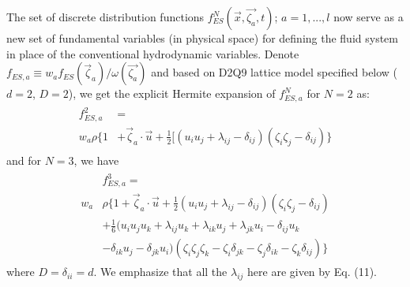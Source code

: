 \documentclass[aip,jmp,amsmath,amssymb,reprint,noshowpacs]{revtex4-1}
\begin{document}
The set of discrete distribution functions $f^N_{ES}(\vec{x},\vec{\zeta_a} ,t)$; $a =1,...,l$ now serve as a new set of fundamental variables (in physical space) for defining the fluid system in place of the conventional hydrodynamic variables.  Denote $f_{ES,a} \equiv w_{a} f_{ES}(\vec\zeta_a )/{\omega(\vec{\zeta_a})}$ and based on D2Q9 lattice model specified below ($d=2$, $D=2$), we get the explicit Hermite expansion of $f^N_{ES,a}$ for $N=2$ as:
\begin{align}
\begin{split}
f_{ES,a}^{2} &=  \\
w_a \rho \{ 1 &+ \vec \zeta_a \cdot \vec u + \frac{1}{2} [( u_i u_j +\lambda_{ij} -\delta_{ij})(\zeta_i \zeta_j - \delta_{ij}) \}
\end{split}
\end{align}
and for $N=3$, we have
\begin{align}
\begin{split}
&f_{ES,a}^{3} =  \\
w_a &\rho \{ 1 + \vec \zeta_a \cdot \vec u + \frac{1}{2} ( u_i u_j +\lambda_{ij} -\delta_{ij})(\zeta_i \zeta_j - \delta_{ij}) \\
&+ \frac{1}{6} (u_{i} u_{j} u_{k} + \lambda_{i j} u_{k} + \lambda_{i k} u_{j} + \lambda_{j k} u_{i} - \delta_{i j} u_{k} \\
&- \delta_{i k} u_{j} - \delta_{j k} u_{i})(\zeta _{i} \zeta _{j} \zeta _{k}-\zeta _{i}\delta_{jk} -\zeta _{j}\delta _{ik} -\zeta _{k} \delta _{ij}) \}
\end{split}
\end{align}
where $D=\delta_{ii}=d$.   We emphasize that all the $\lambda_{i j}$ here are given by Eq. (11).
\end{document}
